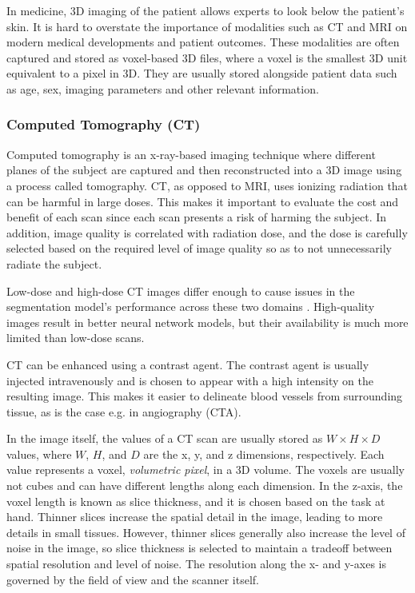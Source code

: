 In medicine, 3D imaging of the patient allows experts to look below the patient's skin. It is hard to overstate the importance of modalities such as CT and MRI on modern medical developments and patient outcomes. These modalities are often captured and stored as voxel-based 3D files, where a voxel is the smallest 3D unit equivalent to a pixel in 3D. They are usually stored alongside patient data such as age, sex, imaging parameters and other relevant information.

\subsubsection{Computed Tomography (CT)}

Computed tomography is an x-ray-based imaging technique where different planes of the subject are captured and then reconstructed into a 3D image using a process called tomography. CT, as opposed to MRI, uses ionizing radiation that can be harmful in large doses. This makes it important to evaluate the cost and benefit of each scan since each scan presents a risk of harming the subject. In addition, image quality is correlated with radiation dose, and the dose is carefully selected based on the required level of image quality so as to not unnecessarily radiate the subject.

Low-dose and high-dose CT images differ enough to cause issues in the segmentation model's performance across these two domains . High-quality images result in better neural network models, but their availability is much more limited than low-dose scans.

CT can be enhanced using a contrast agent. The contrast agent is usually injected intravenously and is chosen to appear with a high intensity on the resulting image. This makes it easier to delineate blood vessels from surrounding tissue, as is the case e.g. in angiography (CTA).

In the image itself, the values of a CT scan are usually stored as $W \times H \times D$ values, where $W$, $H$, and $D$ are the x, y, and z dimensions, respectively. Each value represents a voxel, \textit{volumetric pixel}, in a 3D volume. The voxels are usually not cubes and can have different lengths along each dimension. In the z-axis, the voxel length is known as slice thickness, and it is chosen based on the task at hand. Thinner slices increase the spatial detail in the image, leading to more details in small tissues. However, thinner slices generally also increase the level of noise in the image, so slice thickness is selected to maintain a tradeoff between spatial resolution and level of noise. The resolution along the x- and y-axes is governed by the field of view and the scanner itself.

